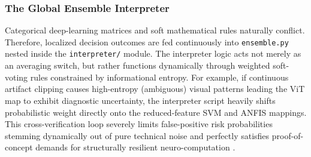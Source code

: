 \subsubsection{The Global Ensemble Interpreter}
Categorical deep-learning matrices and soft mathematical rules naturally conflict. Therefore, localized decision outcomes are fed continuously into \texttt{ensemble.py} nested inside the \texttt{interpreter/} module. 
The interpreter logic acts not merely as an averaging switch, but rather functions dynamically through weighted soft-voting rules constrained by informational entropy. For example, if continuous artifact clipping causes high-entropy (ambiguous) visual patterns leading the ViT map to exhibit diagnostic uncertainty, the interpreter script heavily shifts probabilistic weight directly onto the reduced-feature SVM and ANFIS mappings. This cross-verification loop severely limits false-positive risk probabilities stemming dynamically out of pure technical noise and perfectly satisfies proof-of-concept demands for structurally resilient neuro-computation \cite{ribeiro2016lime}.